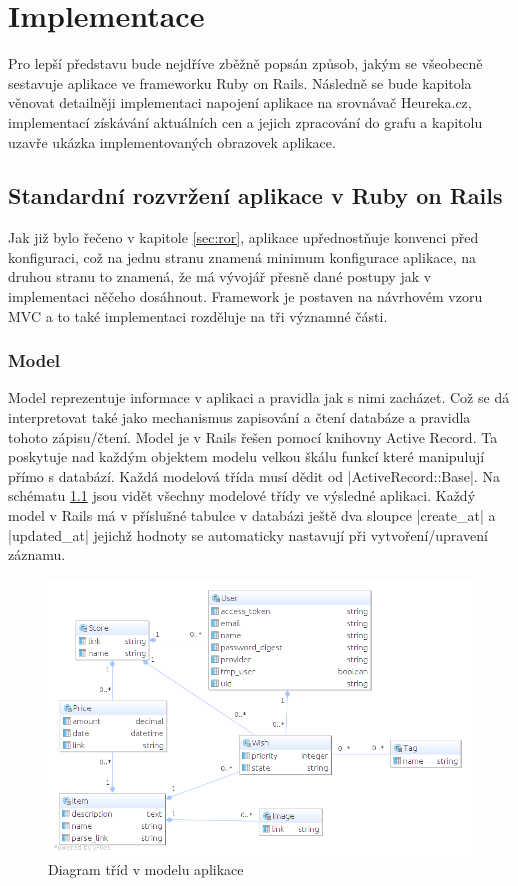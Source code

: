 \chapter{Implementace}
Pro lepší představu bude nejdříve zběžně popsán způsob, jakým se všeobecně sestavuje aplikace ve frameworku Ruby on Rails. Následně se bude kapitola věnovat detailněji implementaci napojení aplikace na srovnávač Heureka.cz, implementací získávání aktuálních cen a jejich zpracování do grafu a kapitolu uzavře ukázka implementovaných obrazovek aplikace.

\section{Standardní rozvržení aplikace v Ruby on Rails}
Jak již bylo řečeno v kapitole \ref{sec:ror}, aplikace upřednostňuje konvenci před konfiguraci, což na jednu stranu znamená minimum konfigurace aplikace, na druhou stranu to znamená, že má vývojář přesně dané postupy jak v implementaci něčeho dosáhnout. Framework je postaven na návrhovém vzoru MVC a to také implementaci rozděluje na tři významné části.

\subsection{Model}
Model reprezentuje informace v aplikaci a pravidla jak s nimi zacházet. Což se dá interpretovat také jako mechanismus zapisování a čtení databáze a pravidla tohoto zápisu/čtení. Model je v Rails řešen pomocí knihovny Active Record. Ta poskytuje nad každým objektem modelu velkou škálu funkcí které manipulují přímo s databází. Každá modelová třída musí dědit od |ActiveRecord::Base|. Na schématu \ref{fig:model-diagram} jsou vidět všechny modelové třídy ve výsledné aplikaci. Každý model v Rails má v příslušné tabulce v databázi ještě dva sloupce |create_at| a |updated_at| jejichž hodnoty se automaticky nastavují při vytvoření/upravení záznamu.

\begin{figure}[htb]
\begin{center}
\includegraphics[width=120mm]{./pictures/model-diagram.png}
\caption{Diagram tříd v modelu aplikace}
\label{fig:model-diagram}
\end{center}
\end{figure}

